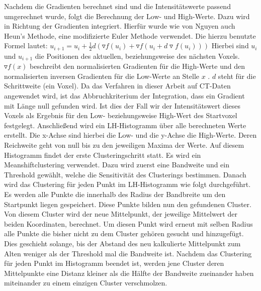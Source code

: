 Nachdem die Gradienten berechnet sind und die Intensitätswerte passend umgerechnet wurde, folgt die Berechnung der Low- und High-Werte. Dazu wird in Richtung der Gradienten integriert. Hierfür wurde wie von Nguyen auch Heun's Methode, eine modifizierte Euler Methode verwendet. Die hierzu benutzte Formel lautet:
\newline
$u_{i+1} = u_{i} + \frac{1}{2}d(\triangledown f (u_{i}) + \triangledown f(u_{i}+d \triangledown f(u_{i}))) $
\newline
Hierbei sind $u_{i}$ und $u_{i+1}$ die Positionen des aktuellen, beziehungsweise des nächsten Voxels. $\triangledown f(x)$ beschreibt den normalisierten Gradienten für die High-Werte und den normalisierten inversen Gradienten für die Low-Werte an Stelle $x$ . $d$ steht für die Schrittweite (ein Voxel).
Da das Verfahren in dieser Arbeit auf CT-Daten angewendet wird, ist das Abbruchkriterium der Integration, dass ein Gradient mit Länge null gefunden wird. Ist dies der Fall wir der Intensitätswert dieses Voxels als Ergebnis für den Low- beziehungsweise High-Wert des Startvoxel festgelegt.
\newline
Anschließend wird ein LH-Histogramm über alle berechneten Werte erstellt. Die x-Achse sind hierbei die Low- und die y-Achse die High-Werte. Deren Reichweite geht von null bis zu den jeweiligen Maxima der Werte.
\newline
Auf diesem Histogramm findet der erste Clusteringschritt  statt. Es wird ein Meanshiftclustering verwendet. Dazu wird zuerst eine Bandweite und ein Threshold gewählt, welche die Sensitivität des Clusterings bestimmen. Danach wird das Clustering für jeden Punkt im LH-Histogramm wie folgt durchgeführt.
\newline
Es werden alle Punkte die innerhalb des Radius der Bandbreite um den Startpunkt liegen gespeichert. Diese Punkte bilden nun den gefundenen Cluster. Von diesem Cluster wird der neue Mittelpunkt, der jeweilige Mittelwert der beiden Koordinaten, berechnet. Um diesen Punkt wird erneut mit selben Radius alle Punkte die bisher nicht zu dem Cluster gehören gesucht und hinzugefügt. Dies geschieht solange, bis der Abstand des neu kalkulierte Mittelpunkt zum Alten weniger als der Threshold mal die Bandweite ist. 
Nachdem das Clustering für jeden Punkt im Histogramm beendet ist, werden jene Cluster deren Mittelpunkte eine Distanz kleiner als die Hälfte der Bandweite zueinander haben miteinander zu einem einzigen Cluster verschmolzen.
\newline
{}
